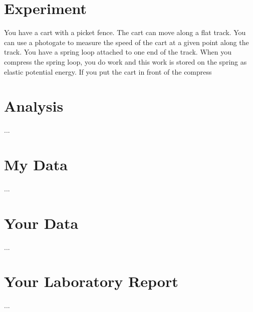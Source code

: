 \section{Experiment}
You have a cart with a picket fence. The cart can move along a flat track. You can use a photogate to measure the speed of the cart at a given point along the track. You have a spring loop attached to one end of the track. When you compress the spring loop, you do work and this work is stored on the spring as elastic potential energy. If you put the cart in front of the compress
\section{Analysis}
...
\section{My Data}
...
\section{Your Data}
...
\newpage
\section{Your Laboratory Report}
...
\newpage
